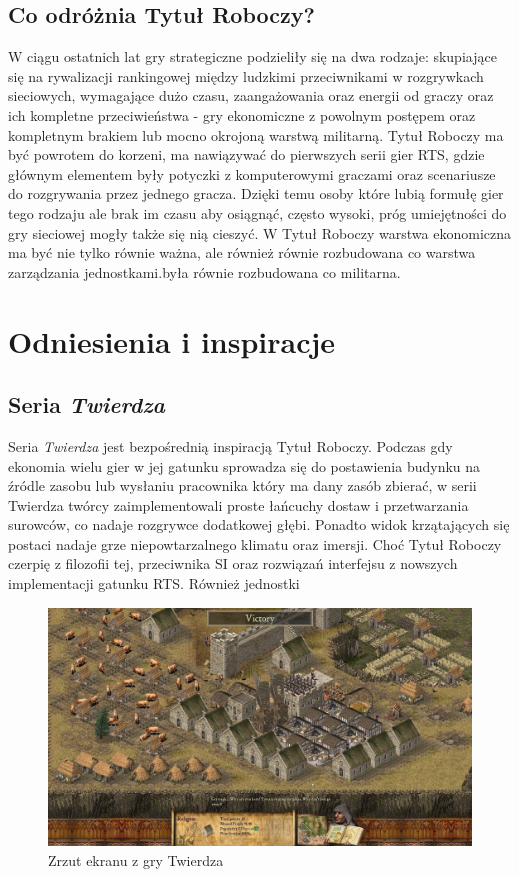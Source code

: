 \documentclass[a4paper]{scrreprt}
\def \GameTiTle{Tytuł Roboczy}
\begin{document}
\section{Co odróżnia \GameTiTle?}
W ciągu ostatnich lat gry strategiczne podzieliły się na dwa rodzaje: skupiające się na rywalizacji rankingowej między ludzkimi przeciwnikami w rozgrywkach sieciowych, wymagające dużo czasu, zaangażowania oraz energii od graczy oraz ich kompletne przeciwieństwa - gry ekonomiczne z powolnym postępem oraz kompletnym brakiem lub mocno okrojoną warstwą militarną.
\GameTiTle{} ma być powrotem do korzeni, ma nawiązywać do pierwszych serii gier RTS, gdzie głównym elementem były potyczki z komputerowymi graczami oraz scenariusze do rozgrywania przez jednego gracza. Dzięki temu osoby które lubią formułę gier tego rodzaju ale brak im czasu aby osiągnąć, często wysoki, próg umiejętności do gry sieciowej mogły także się nią cieszyć. 
W \GameTiTle{} warstwa ekonomiczna ma być nie tylko równie ważna, ale również równie rozbudowana co warstwa zarządzania jednostkami.była równie rozbudowana co militarna.


\chapter{Odniesienia i inspiracje} 

\section{Seria \emph{Twierdza}}
Seria \emph{Twierdza} jest bezpośrednią inspiracją \GameTiTle{}. Podczas gdy ekonomia wielu gier w jej gatunku sprowadza się do postawienia budynku na źródle zasobu lub wysłaniu pracownika który ma dany zasób zbierać, w serii Twierdza twórcy zaimplementowali proste łańcuchy dostaw i przetwarzania surowców, co nadaje rozgrywce dodatkowej głębi. Ponadto widok krzątających się postaci nadaje grze niepowtarzalnego klimatu oraz imersji. Choć \GameTiTle{} czerpię z filozofii tej, przeciwnika SI oraz rozwiązań interfejsu z nowszych implementacji gatunku RTS. Również jednostki 
\begin{figure}[hb]
\centering
\includegraphics[width=1\textwidth]{stronghold2.jpg}
\caption{\label{fig:art} Zrzut ekranu z gry Twierdza}
\end{figure}
\end{document}
